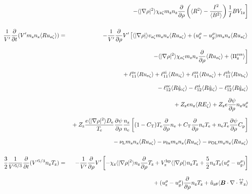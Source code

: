 \documentclass[11pt]{article}
\def\bvec#1{\leavevmode\hbox{\boldmath$#1$}}
\let\vec=\bvec
\def\r#1{{\rm#1}}
\def\aves#1{\langle#1\rangle}
\def\dd#1#2{\frac{\partial #1}{\partial #2}}
\def\tensor#1{\mathord{\displaystyle\mathop{#1}^\leftrightarrow}}
\def\ddrho{\frac{\partial}{\partial\rho}}
\def\ddt{\frac{\partial}{\partial t}}
\def\mz{m_\r{z}}
\def\nee{n_\r{e}}
\def\nz{n_\r{z}}
\def\Te{T_\r{e}}
\def\Tz{T_\r{z}}
\def\Zz{Z_\r{z}}
\def\uzt#1{u_{\r{#1}\zeta}}
\def\qzt#1{\hat{q}_{\r{#1}\zeta}}
\def\uhatth#1{\hat{u}_{\r{#1}\theta}}
\def\urho#1{u_\r{#1}^\rho}
\def\ugrho{u_{g}^\rho}
\def\chis#1{\chi_\r{#1}}
\def\De{D_\r{e}}
\def\nun#1{\nu_\r{0#1}}
\def\nuL{\nu_\r{L}}
\def\nuOL{\nu_\r{OL}}
\begin{document}
\begin{eqnarray}
\nonumber\\[3mm]&&{}
    \left.- \aves{|\nabla\rho|^2} \chis{z\zeta} \mz \nz
          \ddrho \left(\aves{R^2} - \frac{I^2}{\aves{B^2}}\right) \frac{1}{I}BV_{1\r{z}}\right]
\\[5mm]
 \frac{1}{V'} \ddt (V' \mz \nz \aves{R \uzt{z}}) &=&
%
  - \frac{1}{V'} \ddrho V' \left[  \aves{|\nabla\rho|} v_{\r{z}\zeta} \mz \nz \aves{R \uzt{z}}
			       +   (\urho{z} - \ugrho) \mz \nz \aves{R \uzt{z}} \right.
\nonumber\\[3mm]&&{}
                        \left. - \aves{|\nabla\rho|^2} \chis{z\zeta} \mz \nz
			         \ddrho \aves{R \uzt{z}}
                               + \aves{\Pi_\r{z}^\r{res}} \right]
\nonumber\\[3mm]&&{}
%
  + \ell_{11}^\r{ze} \aves{R \uzt{e}}
  + \ell_{11}^\r{zi} \aves{R \uzt{i}}
  + \ell_{11}^\r{zz} \aves{R \uzt{z}}
  + \ell_{11}^\r{zb} \aves{R \uzt{b}}
\nonumber\\[2.5mm]&&{}
%
  - \ell_{12}^\r{ze} \aves{R \qzt{e}}
  - \ell_{12}^\r{zi} \aves{R \qzt{i}}
  - \ell_{12}^\r{zz} \aves{R \qzt{z}}
\nonumber\\[2.5mm]&&{}
%
  + \Zz e                 \nz \aves{R E_\zeta}
%
  + \Zz e \dd{\psi}{\rho} \nz \urho{z}
%
\nonumber\\[2.5mm]&&{}
%
%
%
  + \Zz \frac{e \aves{|\nabla\rho|^2} \De}{\Te} \dd{\psi}{\rho} \frac{\nz}{\nee}
  \left[  (1-C_\r{T})\Te \ddrho \nee
        + C_\r{T} \ddrho \nee \Te
	+ \nee \Te \dd{\psi}{\rho} C_\r{p}\right]
\nonumber\\[2.5mm]&&{}
%
  - \nuL    \mz \nz \aves{R \uzt{z}}
%
  - \nun{z} \mz \nz \aves{R \uzt{z}}
%
  - \nuOL   \mz \nz \aves{R \uzt{z}}
\\[5mm]
 \frac{3}{2}\frac{1}{V'^{5/3}} \ddt (V'^{5/3} \nz \Tz ) &=& 
%
  - \frac{1}{V'} \ddrho V'
    \left[ - \chis{z}          \aves{|\nabla\rho|^2} \nz \ddrho \Tz
           + V_\r{z}^\r{hp} \aves{|\nabla\rho|}   \nz \Tz
           + \frac{5}{2} \nz \Tz ( \urho{z} - \ugrho ) \right]
\nonumber\\[2.5mm]&&{}
%
  + ( \urho{z} - \ugrho ) \ddrho \nz \Tz
%
  + \uhatth{z} \aves{\vec{B}\cdot\nabla\cdot\tensor{\pi}_\r{z}}

\end{eqnarray}
\end{document}

